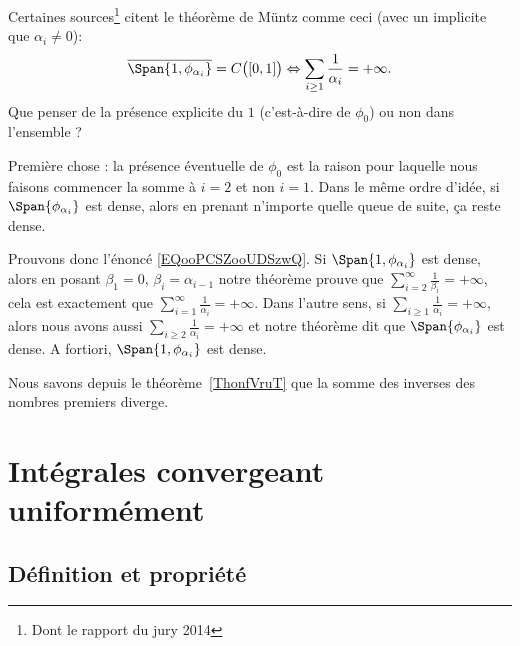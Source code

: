 \begin{remark}      \label{REMooGPYYooCQJwFa}
	Certaines sources\footnote{Dont le rapport du jury 2014} citent le théorème de Müntz comme ceci (avec un implicite que \( \alpha_i\neq 0\)):
	\begin{equation}        \label{EQooPCSZooUDSzwQ}
		\overline{ \Span\{1, \phi_{\alpha_i} \} }=C\big( \mathopen[ 0 , 1 \mathclose] \big) \Leftrightarrow \sum_{i\geq 1}\frac{1}{ \alpha_i }=+\infty.
	\end{equation}
	Que penser de la présence explicite du \( 1\) (c'est-à-dire de \( \phi_0\)) ou non dans l'ensemble ?

	Première chose : la présence éventuelle de \( \phi_0\) est la raison pour laquelle nous faisons commencer la somme à \( i=2\) et non \( i=1\). Dans le même ordre d'idée, si \( \Span\{ \phi_{\alpha_i} \}\) est dense, alors en prenant n'importe quelle queue de suite, ça reste dense.

	Prouvons donc l'énoncé \eqref{EQooPCSZooUDSzwQ}. Si \( \Span\{ 1,\phi_{\alpha_i} \}\) est dense, alors en posant \( \beta_1=0\), \( \beta_i=\alpha_{i-1}\) notre théorème prouve que \( \sum_{i=2}^{\infty}\frac{1}{ \beta_i }=+\infty\), cela est exactement que \( \sum_{i=1}^{\infty}\frac{1}{ \alpha_i }=+\infty\). Dans l'autre sens, si \( \sum_{i\geq 1}\frac{1}{ \alpha_i }=+\infty\), alors nous avons aussi \( \sum_{i\geq 2}\frac{1}{ \alpha_i }=+\infty\) et notre théorème dit que \( \Span \{ \phi_{\alpha_i} \}\) est dense. A fortiori, \( \Span\{ 1,\phi_{\alpha_i} \}\) est dense.
\end{remark}

\begin{example}
	Nous savons depuis le théorème~\ref{ThonfVruT} que la somme des inverses des nombres premiers diverge.
\end{example}

\section{Intégrales convergeant uniformément}

\subsection{Définition et propriété}

